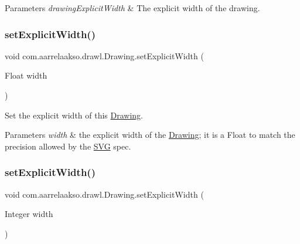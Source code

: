 \begin{DoxyParams}{Parameters}
{\em drawing\+Explicit\+Width} & The explicit width of the drawing. \\
\hline
\end{DoxyParams}
\mbox{\label{classcom_1_1aarrelaakso_1_1drawl_1_1_drawing_acac147e5eb6c93aaa44862c112ee7853}} 
\subsubsection{\texorpdfstring{set\+Explicit\+Width()}{setExplicitWidth()}\hspace{0.1cm}{\footnotesize\ttfamily [2/3]}}
{\footnotesize\ttfamily void com.\+aarrelaakso.\+drawl.\+Drawing.\+set\+Explicit\+Width (\begin{DoxyParamCaption}\item[{Float}]{width }\end{DoxyParamCaption})}



Set the explicit width of this \hyperlink{classcom_1_1aarrelaakso_1_1drawl_1_1_drawing}{Drawing}. 


\begin{DoxyParams}{Parameters}
{\em width} & the explicit width of the \hyperlink{classcom_1_1aarrelaakso_1_1drawl_1_1_drawing}{Drawing}; it is a Float to match the precision allowed by the \hyperlink{classcom_1_1aarrelaakso_1_1drawl_1_1_s_v_g}{S\+VG} spec. \\
\hline
\end{DoxyParams}
\mbox{\label{classcom_1_1aarrelaakso_1_1drawl_1_1_drawing_a7bb5f35f3f77c0d5f319f5898aa203d8}} 
\subsubsection{\texorpdfstring{set\+Explicit\+Width()}{setExplicitWidth()}\hspace{0.1cm}{\footnotesize\ttfamily [3/3]}}
{\footnotesize\ttfamily void com.\+aarrelaakso.\+drawl.\+Drawing.\+set\+Explicit\+Width (\begin{DoxyParamCaption}\item[{Integer}]{width }\end{DoxyParamCaption})}



